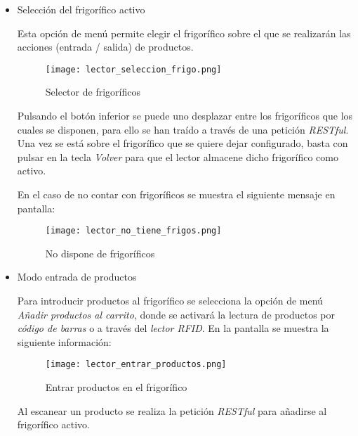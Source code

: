 \begin{itemize}

    \item Selección del frigorífico activo

        Esta opción de menú permite elegir el frigorífico sobre el que se realizarán las acciones (entrada / salida) de productos.

        \begin{figure}[H]
            \centering
            \texttt{[image: lector\_seleccion\_frigo.png]}
            \caption{Selector de frigoríficos}\label{fig:lector_seleccion_frigo}
        \end{figure}


        Pulsando el botón inferior se puede uno desplazar entre los frigoríficos que los cuales se disponen, para ello se han traído a través de una petición \emph{RESTful}. Una vez se está sobre el frigorífico que se quiere dejar configurado, basta con pulsar en la tecla \emph{Volver} para que el lector almacene dicho frigorífico como activo.

        En el caso de no contar con frigoríficos se muestra el siguiente mensaje en pantalla:

        \begin{figure}[H]
            \centering
            \texttt{[image: lector\_no\_tiene\_frigos.png]}
            \caption{No dispone de frigoríficos}\label{fig:lector_no_tiene_frigos}
        \end{figure}

    \item Modo entrada de productos

        Para introducir productos al frigorífico se selecciona la opción de menú \emph{Añadir productos al carrito}, donde se activará la lectura de productos por \emph{código de barras} o a través del \emph{lector RFID}. En la pantalla se muestra la siguiente información:

        \begin{figure}[H]
            \centering
            \texttt{[image: lector\_entrar\_productos.png]}
            \caption{Entrar productos en el frigorífico}\label{fig:lector_entrar_productos}
        \end{figure}

        Al escanear un producto se realiza la petición \emph{RESTful} para añadirse al frigorífico activo.


\end{itemize}
